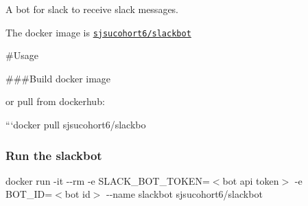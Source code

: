 A bot for slack to receive slack messages.

The docker image is \href{https://hub.docker.com/r/sjsucohort6/slackbot/}{\tt sjsucohort6/slackbot}

\#\+Usage

\#\#\#\+Build docker image 
\begin{DoxyCode}
or pull from dockerhub:

```docker pull sjsucohort6/slackbo
\end{DoxyCode}


\subsubsection*{Run the slackbot}

{\ttfamily docker run -\/it -\/-\/rm -\/e S\+L\+A\+C\+K\+\_\+\+B\+O\+T\+\_\+\+T\+O\+K\+EN=\textquotesingle{}$<$bot api token$>$\textquotesingle{} -\/e B\+O\+T\+\_\+\+ID=\textquotesingle{}$<$bot id$>$\textquotesingle{} -\/-\/name slackbot sjsucohort6/slackbot} 